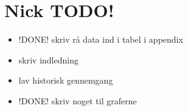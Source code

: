 


\chapter{Nick TODO!}
\begin{itemize}
	\item !DONE! skriv rå data ind i tabel i appendix
	\item skriv indledning
	\item lav historisk gennemgang
	\item !DONE! skriv noget til graferne
\end{itemize}

